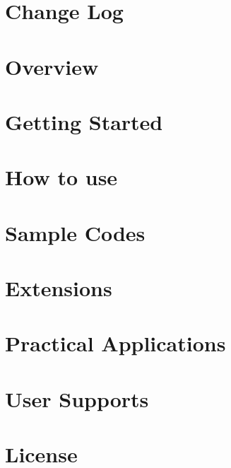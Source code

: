 \documentclass[12pt,a4paper,dvipdfmx]{article} %
\title{\docTitle}
\author{Daisuke Namekata}
\author{Masaki Iwasawa}
\author{Keigo Nitadori}
\author{Ataru Tanikawa}
\author{Takayuki Muranushi}
\author{Long Wang}
\author{Natsuki Hosono}
\author{Jun-ichiro Makino}
\affil{\affiliation}
\date{}
\begin{document}
\maketitle
\tableofcontents
\clearpage

\section{Change Log}
\label{sec:changelog}

\clearpage

\section{Overview}
\label{sec:overview}

\clearpage

\section{Getting Started}
\label{sec:getting_started}

\clearpage

\section{How to use}
\label{sec:how_to_use}

\clearpage

\section{Sample Codes}
\label{sec:samplecode}

\clearpage

\section{Extensions}
\label{sec:extension}

\clearpage

\section{Practical Applications}
\label{sec:applications}

\clearpage

\section{User Supports}
\label{sec:usersupport}

\clearpage

\section{License}
\label{sec:license}

\end{document}
